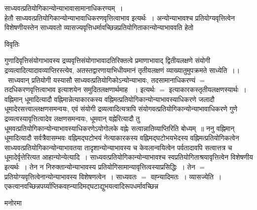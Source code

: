 \documentclass[10pt, openany]{book}
\begin{document}
{साध्यवत्प्रतियोगिकान्योन्याभावासामानाधिकरण्यम्~।~\\

हेतौ साध्यवत्प्रतियोगिकान्योन्याभावाधिकरणवृत्तित्वाभाव इत्यर्थः~। अन्योन्याभावश्च प्रतियोग्यवृत्तित्वेन विशेषणीयस्तेन साध्यवतो व्यासज्यवृत्तिधर्मावच्छिन्नप्रतियोगिताकान्योन्याभाववति हेतो
\begin{center}     विवृतिः \end{center}

गुणादिवृत्तिसंयोगाभावस्य द्रव्यवृत्तिसंयोगाभावादतिरिक्तत्वे प्रमाणाभावाद् द्वितीयलक्षणे संयोगी द्रव्यत्वादित्यादावव्याप्तिरस्त्येव, अतस्तद्वारणायाभिधीयमानं तृतीयलक्षणं व्याख्यातुमुपक्रमते {\la साध्येति~।}।~साध्यवान् प्रतियोगी यस्यासौ साध्यवत्प्रतियोगिकोऽन्योन्याभावः, तदसामानाधिकरण्यं $=$  तदधिकरणवृत्तित्वाभाव इत्याशयेन समुदितलक्षणार्थमाह ~। इत्यर्थः $=$ इत्याकारकस्तृतीयलक्षणस्यार्थः~। वह्निमान् धूमादित्यादौ वह्निमान्नेत्याकारकस्य वह्निमत्प्रतियोगिकान्योन्याभावस्याधिकरणे जलादौ धूमादेरसत्त्वाल्लक्षणसमन्वयः, एवं संयोगी द्रव्यत्वादित्यत्रापि संयोगवत्प्रतियोगिकान्योन्याभावाधिकरणे गुणे द्रव्यत्वस्यावृत्तित्वादेव लक्षणसमन्वयः, धूमवान् वह्नेरित्यादौ तु धूमवत्प्रतियोगिकान्योन्याभावस्याधिकरणेऽयोगोलके वह्नेः सत्वान्नातिव्याप्तिरिति बोध्यम्~॥ ननु वह्निमान् धूमादित्यादौ सर्वत्रैवासम्भवः वह्निमद्घटोभयं नेत्याकारकस्य वह्निमद्घटोभयभेदस्य वह्निमत्प्रतियोगिकत्वेन साध्यवत्प्रतियोगिकान्योन्याभावतया तादृशान्योन्याभावस्य च केवलान्वयित्वेन पर्वतादावपि सत्वात्तत्र च धूमादेर्वृत्तेरित्यत आहान्योन्येत्यादि~। साध्यवत्प्रतियोगिकान्योन्याभावश्च स्वप्रतियोगिताश्रयावृत्तित्वेन विशेषणीय इत्यर्थः~। तेन न
निरुक्तान्योन्याभावस्य प्रतियोगिसामान्यावृत्तित्वस्याप्रसिद्धिः~। तेन $=$ प्रतियोग्यवृत्तित्वेनान्योन्याभावस्य विशेषणत्वेन~। साध्यवतः $=$ वह्न्यादिमतः~। व्यासज्येति~।
एकत्वानवच्छिन्नपर्य्याप्तिकवह्न्यादिमद्घटाद्युभयत्वादिरूपधर्मावच्छिन्न
\begin{center}   मनोरमा  \end{center}

}
\end{document}
